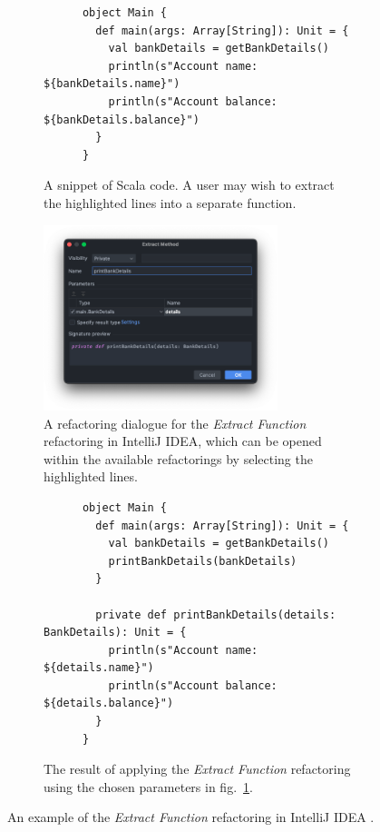 \begin{figure}[htbp]
  \centering
  \begin{subfigure}{\textwidth}
    \centering
    \begin{verbatim}
      object Main {
        def main(args: Array[String]): Unit = {
          val bankDetails = getBankDetails()
          println(s"Account name: ${bankDetails.name}")
          println(s"Account balance: ${bankDetails.balance}")
        }
      }
    \end{verbatim}
    \caption{A snippet of Scala code. A user may wish to extract the highlighted lines into a separate function.}
  \end{subfigure}
  \begin{subfigure}{\textwidth}
    \centering
    \includegraphics[width=0.75\textwidth]{background/extract-function-intellij.png}
    \caption{A refactoring dialogue for the \textit{Extract Function} refactoring in IntelliJ IDEA, which can be opened within the available refactorings by selecting the highlighted lines.}
    \label{fig:extract-function-intellij-dialogue}
  \end{subfigure}
  \begin{subfigure}{\textwidth}
    \vspace{3ex} %
    \centering
    \begin{verbatim}
      object Main {
        def main(args: Array[String]): Unit = {
          val bankDetails = getBankDetails()
          printBankDetails(bankDetails)
        }

        private def printBankDetails(details: BankDetails): Unit = {
          println(s"Account name: ${details.name}")
          println(s"Account balance: ${details.balance}")
        }
      }
    \end{verbatim}
    \caption{The result of applying the \textit{Extract Function} refactoring using the chosen parameters in fig.~\ref{fig:extract-function-intellij-dialogue}.}
  \end{subfigure}
  \caption{An example of the \textit{Extract Function} refactoring in IntelliJ IDEA \cite{jetbrains_intellij_2021}.}
  \label{fig:extract-function-intellij}
\end{figure}

